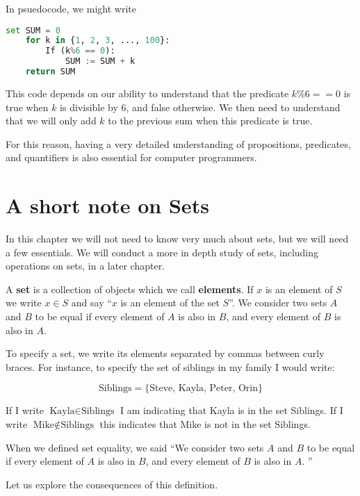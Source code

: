 In psuedocode, we might write

\begin{lstlisting}[language=Python]
	set SUM = 0
	for k in {1, 2, 3, ..., 100}:
		If (k%6 == 0):
			SUM := SUM + k 
	return SUM
\end{lstlisting}

This code depends on our ability to understand that the predicate $k\%6 == 0$ is true when $k$ is divisible by $6$, and false otherwise.  We then need to understand that we will only add $k$ to the previous sum when this predicate is true.

For this reason, having a very detailed understanding of propositions, predicates, and quantifiers is also essential for computer programmers.

\section{A short note on Sets}

In this chapter we will not need to know very much about sets, but we will need a few   essentials.  We will conduct a more in depth study of sets, including operations on sets, in a later chapter.

\begin{definition}
		A \textbf{set} is a collection of objects which we  call  \textbf{elements}.  If $x$ is an element of $S$ we write $x \in S$ and say ``$x$ is an element of the set $S$''.  We consider two sets $A$ and $B$ to be equal if every element of $A$ is also in $B$, and every element of $B$ is also in $A$. 
	\end{definition}

To specify a set, we write its elements separated by commas between curly braces.  For instance, to specify the set of siblings in my family I would write:

\[
\textrm{Siblings} = \{\textrm{Steve, Kayla, Peter, Orin}\}
\]

If I write $\textrm{Kayla} \in \textrm{Siblings}$ I am indicating that Kayla is in the set Siblings.  If I write $\textrm{Mike} \notin \textrm{Siblings}$ this indicates that Mike is not in the set Siblings.

When we defined set equality, we said ``We consider two sets $A$ and $B$ to be equal if every element of $A$ is also in $B$, and every element of $B$ is also in $A$. ''

Let us explore the consequences of this definition.

